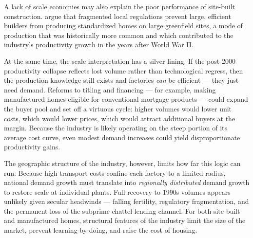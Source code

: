 \documentclass[11pt,article,oneside]{memoir}
\begin{document}
A lack of scale economies may also explain the poor performance of
site-built construction. \citet{damico_why_2024} argue that fragmented
local regulations prevent large, efficient builders from producing
standardized homes on large greenfield sites, a mode of production that
was historically more common and which contributed to the industry's
productivity growth in the years after World War II.

At the same time, the scale interpretation has a silver lining. If the
post-2000 productivity collapse reflects lost volume rather than
technological regress, then the production knowledge still exists and
factories \emph{can} be efficient --- they just need demand. Reforms to
titling and financing --- for example, making manufactured homes
eligible for conventional mortgage products --- could expand the buyer
pool and set off a virtuous cycle: higher volumes would lower unit
costs, which would lower prices, which would attract additional buyers
at the margin. Because the industry is likely operating on the steep
portion of its average cost curve, even modest demand increases could
yield disproportionate productivity gains.

The geographic structure of the industry, however, limits how far this
logic can run. Because high transport costs confine each factory to a
limited radius, national demand growth must translate into
\emph{regionally distributed} demand growth to restore scale at
individual plants. Full recovery to 1990s volumes appears unlikely given
secular headwinds --- falling fertility, regulatory fragmentation, and
the permanent loss of the subprime chattel-lending channel. For both
site-built and manufactured homes, structural features of the industry
limit the size of the market, prevent learning-by-doing, and raise the
cost of housing.




\end{document}
